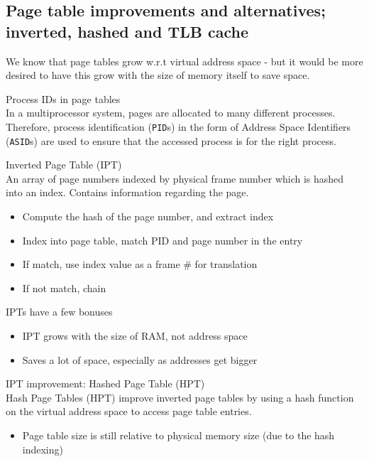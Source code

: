 \documentclass[journal, letterpaper]{IEEEtran}
\begin{document}
\subsection{Page table improvements and alternatives; inverted, hashed and TLB cache}
We know that page tables grow w.r.t virtual address space - but it would be more desired to have this grow with the size of memory itself to save space.
\begin{aside}{Process IDs in page tables} \\
    In a multiprocessor system, pages are allocated to many different processes. Therefore, process identification (\verb|PID|s) in the form of Address Space Identifiers (\verb|ASID|s) are used to ensure that the accessed process is for the right process.
\end{aside}
\begin{theory}{Inverted Page Table (IPT)} \\
    An array of page numbers indexed by physical frame number which is hashed into an index. Contains information regarding the page.
    \begin{itemize}
        \item Compute the hash of the page number, and extract index
        \item Index into page table, match PID and page number in the entry
        \item If match, use index value as a frame \# for translation
        \item If not match, chain
    \end{itemize}
    IPTs have a few bonuses
    \begin{itemize}
        \item[\ding{51}] IPT grows with the size of RAM, not address space
        \item[\ding{51}] Saves a lot of space, especially as addresses get bigger
    \end{itemize}
\end{theory}
\begin{aside}{IPT improvement: Hashed Page Table (HPT)} \\
    Hash Page Tables (HPT) improve inverted page tables by using a hash function on the virtual address space to access page table entries.
    \begin{itemize}
        \item Page table size is still relative to physical memory size (due to the hash indexing)
    \end{itemize}
\end{aside}
\end{document}
